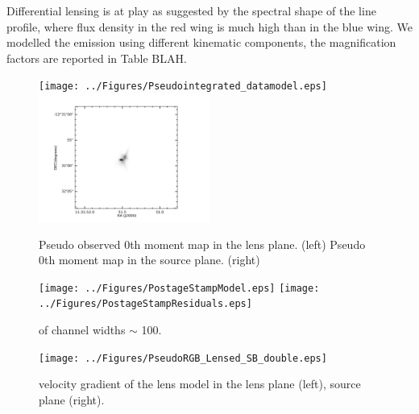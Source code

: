 \documentclass[]{emulateapj}
\begin{document}
Differential lensing is at play as suggested by the spectral shape of the  line profile, where 
flux density in the red wing is much high than in the blue wing.  
We modelled the emission using different kinematic components, the magnification factors are reported in Table BLAH.


\begin{figure}[tbph]
\centering
\texttt{[image: ../Figures/Pseudointegrated\_datamodel.eps]}
\includegraphics[width=0.50\textwidth]{../Figures/SourcesPlane.png}
\caption{
Pseudo observed 0th moment map in the lens plane. (left)
Pseudo 0th moment map in the source plane. (right)
\label{fig:}}
\end{figure}


\begin{figure}[tbph]
\centering
\texttt{[image: ../Figures/PostageStampModel.eps]}
\texttt{[image: ../Figures/PostageStampResiduals.eps]}
\caption{
of channel widths $\sim$ 100\kms. 
\label{fig:}}
\end{figure}


\begin{figure}[tbph]
\centering
\texttt{[image: ../Figures/PseudoRGB\_Lensed\_SB\_double.eps]}
\caption{
velocity gradient of the lens model in the lens plane (left), source plane
(right).
\label{fig:}}
\end{figure}


\end{document}
